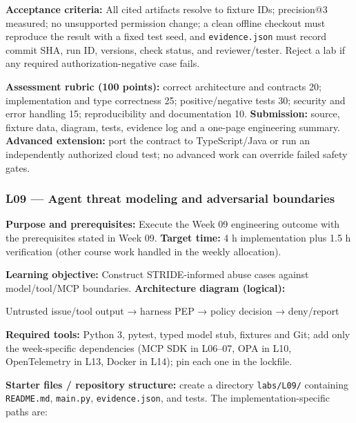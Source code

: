 \documentclass[
  10pt,
]{article}
\newenvironment{Shaded}{\begin{snugshade}}{\end{snugshade}}
\newcommand{\NormalTok}[1]{#1}
\begin{document}
\textbf{Acceptance criteria:} All cited artifacts resolve to fixture
IDs; precision@3 measured; no unsupported permission change; a clean
offline checkout must reproduce the result with a fixed test seed, and
\texttt{evidence.json} must record commit SHA, run ID, versions, check
status, and reviewer/tester. Reject a lab if any required
authorization-negative case fails.

\textbf{Assessment rubric (100 points):} correct architecture and
contracts 20; implementation and type correctness 25; positive/negative
tests 30; security and error handling 15; reproducibility and
documentation 10. \textbf{Submission:} source, fixture data, diagram,
tests, evidence log and a one-page engineering summary. \textbf{Advanced
extension:} port the contract to TypeScript/Java or run an independently
authorized cloud test; no advanced work can override failed safety
gates.

\subsubsection{L09 --- Agent threat modeling and adversarial
boundaries}\label{l09-agent-threat-modeling-and-adversarial-boundaries}

\textbf{Purpose and prerequisites:} Execute the Week 09 engineering
outcome with the prerequisites stated in Week 09. \textbf{Target time:}
4 h implementation plus 1.5 h verification (other course work handled in
the weekly allocation).

\textbf{Learning objective:} Construct STRIDE-informed abuse cases
against model/tool/MCP boundaries. \textbf{Architecture diagram
(logical):}

\begin{Shaded}
\begin{Highlighting}[]
\NormalTok{Untrusted issue/tool output → harness PEP → policy}
\NormalTok{decision → deny/report}
\end{Highlighting}
\end{Shaded}

\textbf{Required tools:} Python 3, pytest, typed model stub, fixtures
and Git; add only the week-specific dependencies (MCP SDK in L06--07,
OPA in L10, OpenTelemetry in L13, Docker in L14); pin each one in the
lockfile.

{\raggedright \textbf{Starter files / repository structure:} create a directory
\texttt{labs/\allowbreak L09/} containing \texttt{README.md}, \texttt{main.py},
\texttt{evidence.json}, and tests. The implementation-specific paths
are:\par}
\end{document}
